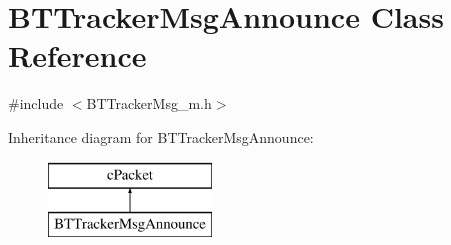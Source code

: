 \hypertarget{classBTTrackerMsgAnnounce}{}\section{B\+T\+Tracker\+Msg\+Announce Class Reference}
\label{classBTTrackerMsgAnnounce}


{\ttfamily \#include $<$B\+T\+Tracker\+Msg\+\_\+m.\+h$>$}

Inheritance diagram for B\+T\+Tracker\+Msg\+Announce\+:\begin{figure}[H]
\begin{center}
\leavevmode
\includegraphics[height=2.000000cm]{classBTTrackerMsgAnnounce}
\end{center}
\end{figure}
